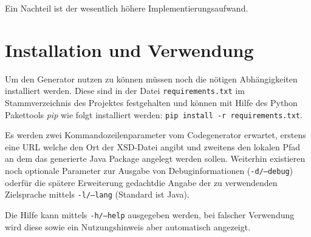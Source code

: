 Ein Nachteil ist der wesentlich höhere Implementierungsaufwand.

\section{Installation und Verwendung}

Um den Generator nutzen zu können müssen noch die nötigen Abhängigkeiten installiert werden. Diese sind in der Datei \texttt{requirements.txt} im Stammverzeichnis des Projektes festgehalten und können mit Hilfe des Python Pakettools \emph{pip} wie folgt installiert werden: \texttt{pip install -r requirements.txt}.

Es werden zwei Kommandozeilenparameter vom Codegenerator erwartet, erstens eine \gls{URL} welche den Ort der \gls{XSD}-Datei angibt und zweitens den lokalen Pfad an dem das generierte Java Package angelegt werden sollen. Weiterhin existieren noch optionale Parameter zur Ausgabe von Debuginformationen (\texttt{-d/--debug}) oder\textemdash{}für die spätere Erweiterung gedacht\textemdash{}die Angabe der zu verwendenden Zielsprache mittels \texttt{-l/--lang} (Standard ist Java).

Die Hilfe kann mittels \texttt{-h/--help} ausgegeben werden, bei falscher Verwendung wird diese sowie ein Nutzungshinweis aber automatisch angezeigt.